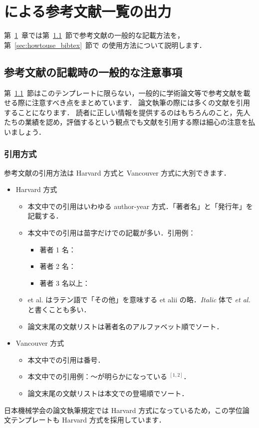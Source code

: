 \chapter{\BibTeX による参考文献一覧の出力}
\label{ch:bibtex}

第~\ref{ch:bibtex}~章では第~\ref{sec:bibcaution}~節で参考文献の一般的な記載方法を，第~\ref{sec:howtouse_bibtex}~節で \BibTeX の使用方法について説明します．

\section{参考文献の記載時の一般的な注意事項}
\label{sec:bibcaution}

第~\ref{sec:bibcaution}~節はこのテンプレートに限らない，一般的に学術論文等で参考文献を載せる際に注意すべき点をまとめています．
論文執筆の際には多くの文献を引用することになります．
読者に正しい情報を提供するのはもちろんのこと，先人たちの業績を認め，評価するという観点でも文献を引用する際は細心の注意を払いましょう．

\subsection{引用方式}
\label{ssec:citation_style}

参考文献の引用方法は Harvard 方式と Vancouver 方式に大別できます．
\begin{itemize}
    \item Harvard 方式
    \begin{itemize}
        \item 本文中での引用はいわゆる author-year 方式．「著者名」と「発行年」を記載する．
        \item 本文中での引用は苗字だけでの記載が多い．引用例：
        \begin{itemize}
            \item 著者 1 名：\cite{Reynolds:PhilTransRoySoc1883}
            \item 著者 2 名：\cite{Schmid:Springer2001}
            \item 著者 3 名以上：\cite{Berghout:JFM2020}
        \end{itemize}
        \item et al. はラテン語で「その他」を意味する et alii の略．\textit{Italic} 体で \textit{et al.} と書くことも多い．
        \item 論文末尾の文献リストは著者名のアルファベット順でソート．
    \end{itemize}
    \item Vancouver 方式
    \begin{itemize}
        \item 本文中での引用は番号．
        \item 本文中での引用例：～が明らかになっている $^{[1,2]}$．
        \item 論文末尾の文献リストは本文での登場順でソート．
    \end{itemize}
\end{itemize}
日本機械学会の論文執筆規定では Harvard 方式になっているため，この学位論文テンプレートも Harvard 方式を採用しています．

